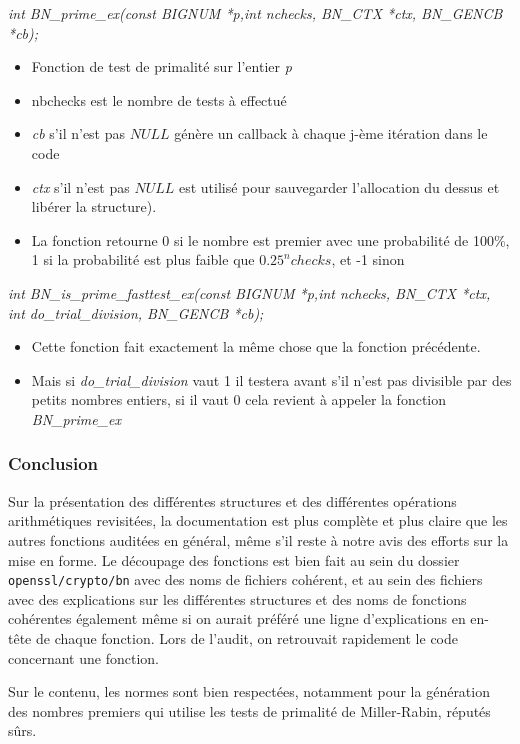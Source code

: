 			\textit{int BN\_prime\_ex(const BIGNUM *p,int nchecks, BN\_CTX *ctx, BN\_GENCB *cb);} 
			\begin{itemize}
			\item Fonction de test de primalité sur l'entier \textit{p}
			\item nbchecks est le nombre de tests à effectué
			\item \textit{cb} s'il n'est pas $NULL$ génère un callback à chaque j-ème itération dans le code
			\item \textit{ctx} s'il n'est pas $NULL$ est utilisé pour sauvegarder l'allocation du dessus et libérer la structure).
			\item La fonction retourne 0 si le nombre est premier avec une probabilité de 100\%, 1 si la probabilité est plus faible que $0.25^nchecks$, et -1 sinon\\
			\end{itemize}

			\textit{int BN\_is\_prime\_fasttest\_ex(const BIGNUM *p,int nchecks, BN\_CTX *ctx, int do\_trial\_division, BN\_GENCB *cb);} 
			\begin{itemize}
			\item Cette fonction fait exactement la même chose que la fonction précédente.
			\item Mais si \textit{do\_trial\_division} vaut 1 il testera avant s'il n'est pas divisible par des petits nombres entiers, si il vaut 0 cela revient à appeler la fonction \textit{BN\_prime\_ex}
			\end{itemize}

		\subsubsection{Conclusion}

			Sur la présentation des différentes structures et des différentes opérations arithmétiques revisitées, la documentation est plus complète et plus claire que les autres fonctions auditées en général, même s'il reste à notre avis des efforts sur la mise en forme. Le découpage des fonctions est bien fait au sein du dossier \texttt{openssl/crypto/bn} avec des noms de fichiers cohérent, et au sein des fichiers avec des explications sur les différentes structures et des noms de fonctions cohérentes également même si on aurait préféré une ligne d'explications en en-tête de chaque fonction. Lors de l'audit, on retrouvait rapidement le code concernant une fonction.

			Sur le contenu, les normes sont bien respectées, notamment pour la génération des nombres premiers qui utilise les tests de primalité de Miller-Rabin, réputés sûrs.


